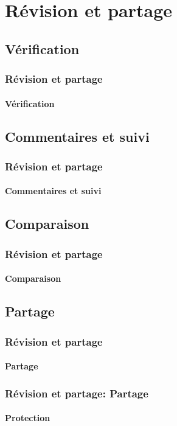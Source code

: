 \documentclass[xcolor=table]{beamer}
\begin{document}
\section{Révision et partage}

%

\subsection{Vérification}

\begin{frame}
\frametitle{Révision et partage}
\framesubtitle{Vérification}

\end{frame}

\subsection{Commentaires et suivi}

\begin{frame}
\frametitle{Révision et partage}
\framesubtitle{Commentaires et suivi}

\end{frame}

\subsection{Comparaison}

\begin{frame}
\frametitle{Révision et partage}
\framesubtitle{Comparaison}

\end{frame}

\subsection{Partage}

\begin{frame}
\frametitle{Révision et partage}
\framesubtitle{Partage}


\end{frame}

\begin{frame}
\frametitle{Révision et partage: Partage}
\framesubtitle{Protection}

\end{frame}
\end{document}
